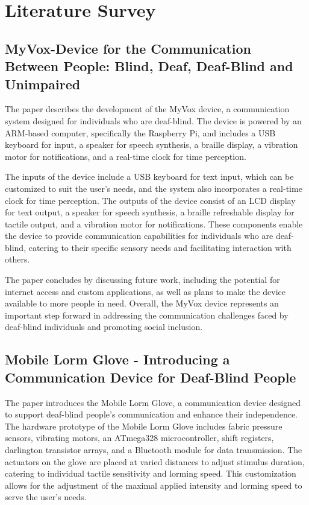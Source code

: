 \documentclass[12pt,a4paper]{report}
\begin{document}

\chapter{Literature Survey}

\section{MyVox-Device for the Communication Between People: Blind, Deaf, Deaf-Blind and Unimpaired}

The paper\cite{ref1} describes the development of the MyVox device, a communication system designed for individuals who are deaf-blind. The device is powered by an ARM-based computer, specifically the Raspberry Pi, and includes a USB keyboard for input, a speaker for speech synthesis, a braille display, a vibration motor for notifications, and a real-time clock for time perception.

 The inputs of the device include a USB keyboard for text input, which can be customized to suit the user's needs, and the system also incorporates a real-time clock for time perception. The outputs of the device consist of an LCD display for text output, a speaker for speech synthesis, a braille refreshable display for tactile output, and a vibration motor for notifications. These components enable the device to provide communication capabilities for individuals who are deaf-blind, catering to their specific sensory needs and facilitating interaction with others.

The paper concludes by discussing future work, including the potential for internet access and custom applications, as well as plans to make the device available to more people in need. Overall, the MyVox device represents an important step forward in addressing the communication challenges faced by deaf-blind individuals and promoting social inclusion.

\section{Mobile Lorm Glove - Introducing a Communication Device for Deaf-Blind People }
The paper\cite{ref2} introduces the Mobile Lorm Glove, a communication device designed to support deaf-blind people's communication and enhance their independence.
The hardware prototype of the Mobile Lorm Glove includes fabric pressure sensors, vibrating motors, an ATmega328 microcontroller, shift registers, darlington transistor arrays, and a Bluetooth module for data transmission. The actuators on the glove are placed at varied distances to adjust stimulus duration, catering to individual tactile sensitivity and lorming speed. This customization allows for the adjustment of the maximal applied intensity and lorming speed to serve the user's needs.
\end{document}
